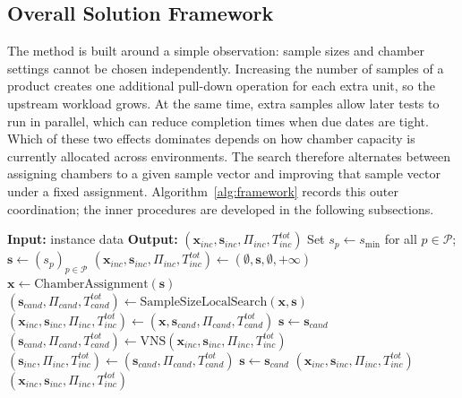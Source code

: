\subsection{Overall Solution Framework}
\label{subsec:framework}

The method is built around a simple observation: sample sizes and
chamber settings cannot be chosen independently.
Increasing the number of samples of a product creates one additional
pull-down operation for each extra unit, so the upstream workload
grows.
At the same time, extra samples allow later tests to run in parallel,
which can reduce completion times when due dates are tight.
Which of these two effects dominates depends on how chamber capacity
is currently allocated across environments.
The search therefore alternates between assigning chambers to a given
sample vector and improving that sample vector under a fixed
assignment.
Algorithm~\ref{alg:framework} records this outer coordination;
the inner procedures are developed in the following subsections.

\begin{algorithm}[H]
\caption{Overall Solution Framework}
\label{alg:framework}
\begin{algorithmic}[1]
\State \textbf{Input:} instance data
\State \textbf{Output:} \((\mathbf{x}_{inc},\mathbf{s}_{inc},\Pi_{inc},T^{tot}_{inc})\)
\State Set \(s_p\leftarrow s_{\min}\) for all \(p\in\mathcal{P}\); \(\mathbf{s}\leftarrow(s_p)_{p\in\mathcal{P}}\) \label{step:fw-init}
\State \((\mathbf{x}_{inc},\mathbf{s}_{inc},\Pi_{inc},T^{tot}_{inc})\leftarrow(\emptyset,\mathbf{s},\emptyset,+\infty)\)
    \State \(\mathbf{x}\leftarrow\text{ChamberAssignment}(\mathbf{s})\) \label{step:fw-assign}
    \State \((\mathbf{s}_{cand},\Pi_{cand},T^{tot}_{cand})\leftarrow\text{SampleSizeLocalSearch}(\mathbf{x},\mathbf{s})\) \label{step:fw-ls}
     \label{step:fw-lex}
        \State \((\mathbf{x}_{inc},\mathbf{s}_{inc},\Pi_{inc},T^{tot}_{inc})\leftarrow(\mathbf{x},\mathbf{s}_{cand},\Pi_{cand},T^{tot}_{cand})\)
        \State \(\mathbf{s}\leftarrow\mathbf{s}_{cand}\)
    \Else
        \State \((\mathbf{s}_{cand},\Pi_{cand},T^{tot}_{cand})\leftarrow\text{VNS}(\mathbf{x}_{inc},\mathbf{s}_{inc},\Pi_{inc},T^{tot}_{inc})\) \label{step:fw-vns}
            \State \((\mathbf{s}_{inc},\Pi_{inc},T^{tot}_{inc})\leftarrow(\mathbf{s}_{cand},\Pi_{cand},T^{tot}_{cand})\)
            \State \(\mathbf{s}\leftarrow\mathbf{s}_{cand}\)
        \Else
            \State \Return \((\mathbf{x}_{inc},\mathbf{s}_{inc},\Pi_{inc},T^{tot}_{inc})\) \label{step:fw-stop}
        \EndIf
    \EndIf
\EndFor
\State \Return \((\mathbf{x}_{inc},\mathbf{s}_{inc},\Pi_{inc},T^{tot}_{inc})\)
\end{algorithmic}
\end{algorithm}

